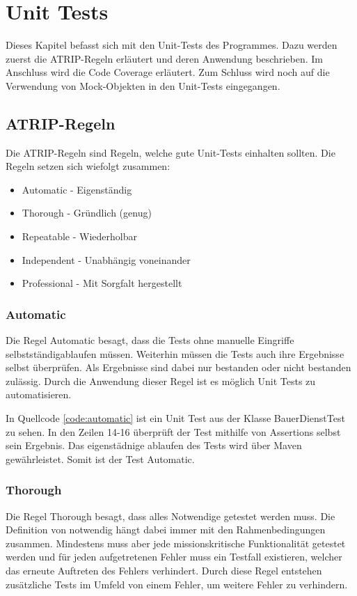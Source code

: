 \chapter{Unit Tests}
Dieses Kapitel befasst sich mit den Unit-Tests des Programmes. Dazu werden zuerst die ATRIP-Regeln erläutert und deren Anwendung beschrieben. Im Anschluss wird die Code Coverage erläutert. Zum Schluss wird noch auf die Verwendung von Mock-Objekten in den Unit-Tests eingegangen.

\section{ATRIP-Regeln}
Die ATRIP-Regeln sind Regeln, welche gute Unit-Tests einhalten sollten.
Die Regeln setzen sich wiefolgt zusammen:
\begin{itemize}
	\item Automatic - Eigenständig
	\item Thorough - Gründlich (genug)
	\item Repeatable - Wiederholbar
	\item Independent - Unabhängig voneinander
	\item Professional - Mit Sorgfalt hergestellt
\end{itemize}

\subsection{Automatic}
Die Regel \glqq{}Automatic\grqq{} besagt, dass die Tests ohne manuelle Eingriffe selbstständigablaufen müssen. Weiterhin müssen die Tests auch ihre Ergebnisse selbst überprüfen. Als Ergebnisse sind dabei nur \glqq{}bestanden\grqq{} oder \glqq{}nicht bestanden\grqq{} zulässig. Durch die Anwendung dieser Regel ist es möglich Unit Tests zu automatisieren.



In Quellcode \ref{code:automatic} ist ein Unit Test aus der Klasse BauerDienstTest zu sehen. In den Zeilen 14-16 überprüft der Test mithilfe von Assertions selbst sein Ergebnis. Das eigenstädnige ablaufen des Tests wird über Maven gewährleistet. Somit ist der Test Automatic.

\subsection{Thorough}
Die Regel \glqq{}Thorough\grqq{} besagt, dass alles Notwendige getestet werden muss. Die Definition von notwendig hängt dabei immer mit den Rahmenbedingungen zusammen. Mindestens muss aber jede missionskritische Funktionalität getestet werden und für jeden aufgetretenen Fehler muss ein Testfall existieren, welcher das erneute Auftreten des Fehlers verhindert. Durch diese Regel entstehen zusätzliche Tests im Umfeld von einem Fehler, um weitere Fehler zu verhindern.

